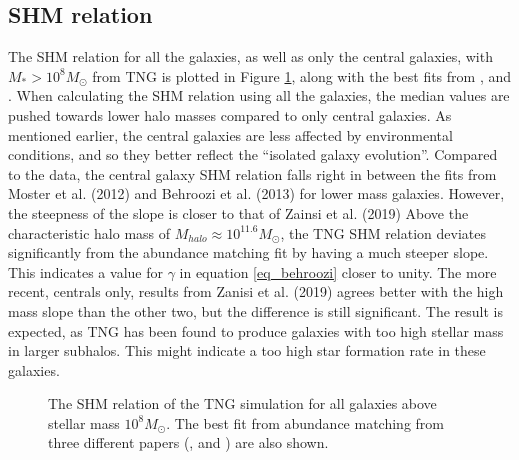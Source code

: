 
\subsection{SHM relation}
The SHM relation for all the galaxies, as well as only the central galaxies, with $M_{*} > 10^8 M_{\odot}$ from TNG is plotted in Figure \ref{shmr_res}, along with the best fits from \textcite{Moster2012}, \textcite{Behroozi2013} and \textcite{Zanisi2019}.
When calculating the SHM relation using all the galaxies, the median values are pushed towards lower halo masses compared to only central galaxies. As mentioned earlier, the central galaxies are less affected by environmental conditions, and so they better reflect the ``isolated galaxy evolution''. Compared to the data, the central galaxy SHM relation falls right in between the fits from Moster et al. (2012) and Behroozi et al. (2013) for lower mass galaxies. However, the steepness of the slope is closer to that of Zainsi et al. (2019) Above the characteristic halo mass of $M_{halo} \approx 10^{11.6} M_{\odot}$, the TNG SHM relation deviates significantly from the abundance matching fit by having a much steeper slope. This indicates a value for $\gamma$ in equation \ref{eq_behroozi} closer to unity. The more recent, centrals only, results from Zanisi et al. (2019) agrees better with the high mass slope than the other two, but the difference is still significant. The result is expected, as TNG has been found to produce galaxies with too high stellar mass in larger subhalos. This might indicate a too high star formation rate in these galaxies.


\begin{figure}
    \centering
    \caption{The SHM relation of the TNG simulation for all galaxies above stellar mass $10^8 M_{\odot}$. The best fit from abundance matching from three different papers (\textcite{Moster2012}, \textcite{Behroozi2013} and \textcite{Zanisi2019}) are also shown.} 
    \label{shmr_res}
\end{figure}



